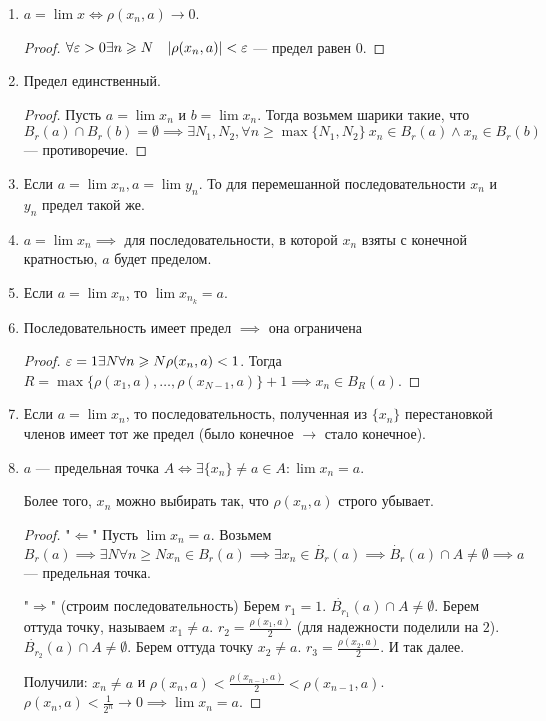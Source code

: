 \begin{properties}
    \begin{enumerate}
        \item $a = \lim x \iff \rho(x_n, a) \to 0$.
\begin{proof}
             $\forall \varepsilon > 0 \exists n \geqslant N\quad |\rho(x_n, a)| < \varepsilon$ --- предел равен 0.
\end{proof}
        \item Предел единственный. 
            \begin{proof}
                Пусть $a = \lim x_n$ и $b = \lim x_n$. Тогда возьмем шарики такие, что  $B_r(a) \cap B_r(b) = \emptyset \implies \exists N_1, N_2, \forall n \ge \max\{N_1, N_2\}\ x_n \in B_r(a) \land x_n \in B_r(b)$ --- противоречие.
            \end{proof}
        \item Если $a = \lim x_n, a = \lim y_n$. То для перемешанной последовательности $x_n$ и  $y_n$ предел такой же.
        \item  $a = \lim x_n \implies $ для последовательности, в которой $x_n$ взяты с конечной кратностью, $a$ будет пределом.
        \item Если $a = \lim x_n$, то  $\lim x_{n_k} = a$.
        \item Последовательность имеет предел $\implies$ она ограничена
             \begin{proof}
                $\varepsilon = 1 \exists N \forall n \geqslant N \rho(x_n, a) < 1$. Тогда $R = \max\{\rho(x_1, a), \ldots, \rho(x_{N-1}, a)\} + 1 \implies x_n \in B_R(a)$.
            \end{proof}
        \item Если $a = \lim x_n$, то последовательность, полученная из  $\{x_n\}$ перестановкой членов имеет тот же предел (было конечное $\to$ стало конечное).
        \item $a$ --- предельная точка  $A \iff \exists \{x_n\} \neq a \in A\!: \lim x_n = a$.

            Более того,  $x_n$ можно выбирать так, что  $\rho(x_n, a)$ строго убывает.
            \begin{proof}
                "$\Leftarrow$" Пусть  $\lim x_n = a$. Возьмем  $B_r(a) \implies \exists N \forall n \ge N x_n \in B_r(a) \implies \exists x_n \in \dot{B_r}(a) \implies \dot{B_r}(a) \cap A \neq \emptyset \implies a$ --- предельная точка.

                "$\Rightarrow$" (строим последовательность) Берем  $r_1 = 1$. $\dot{B_{r_1}}(a) \cap A \neq \emptyset$. Берем оттуда точку, называем  $x_1 \neq a$. $r_2 = \frac{\rho(x_1,a)}{2}$ (для надежности поделили на $2$). $\dot{B_{r_2}}(a) \cap A \neq \emptyset$. Берем оттуда точку $x_2 \neq a$. $r_3 = \frac{\rho(x_2, a)}{2}$. И так далее.

                Получили: $x_n \neq a$ и  $\rho(x_n, a) < \frac{\rho(x_{n-1}, a)}{2} < \rho(x_{n-1}, a)$. $\rho(x_n, a) < \frac{1}{2^n} \to 0 \implies \lim x_n = a$.
            \end{proof}
    \end{enumerate}
\end{properties}
